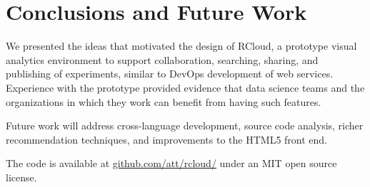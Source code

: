 \section{Conclusions and Future Work}

We presented the ideas that motivated the design of RCloud,
a prototype visual analytics environment to support
collaboration, searching, sharing, and publishing of
experiments, similar to DevOps development of web services.
Experience with the prototype provided evidence that
data science teams and the organizations in which they work
can benefit from having such features.

Future work will address cross-language development,
source code analysis, richer recommendation techniques,
and improvements to the HTML5 front end.

The code is available 
at \url{github.com/att/rcloud/}
under an MIT open source license.
